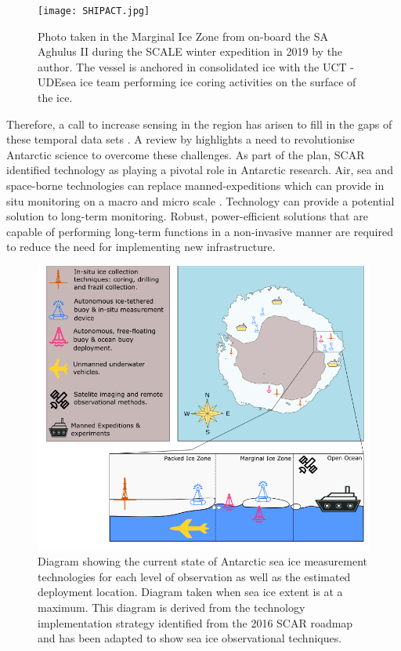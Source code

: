 \begin{figure}[H]
    \centering
    \texttt{[image: SHIPACT.jpg]}
    \caption{Photo taken in the Marginal Ice Zone from on-board the SA Aghulus II during the SCALE winter expedition in 2019 by the author. The vessel is anchored in consolidated ice with the UCT \protect\footnotemark -UDE\protect\footnotemark sea ice team performing ice coring activities on the surface of the ice.}
    \label{fig:cruise}
\end{figure}

Therefore, a call to increase sensing in the region has arisen to fill in the gaps of these temporal data sets \cite{kennicutt2019sustained}. A review by \textcite{kennicutt2016delivering} highlights a need to revolutionise Antarctic science to overcome these challenges. As part of the plan, SCAR identified technology as playing a pivotal role in Antarctic research. Air, sea and space-borne technologies can replace manned-expeditions which can provide in situ monitoring on a macro and micro scale \cite{kennicutt2016delivering}. Technology can provide a potential solution to long-term monitoring. Robust, power-efficient solutions that are capable of performing long-term functions in a non-invasive manner are required to reduce the need for implementing new infrastructure.\par

\begin{figure}[H]
    \centering
    \includegraphics[scale=0.5]{tech.png}
    \caption{ Diagram showing the current state of Antarctic sea ice measurement technologies for each level of observation as well as the estimated deployment location. Diagram taken when sea ice extent is at a maximum. This diagram is derived from the technology implementation strategy identified from the 2016 SCAR roadmap \cite{kennicutt2019sustained}\protect\footnotemark \space and has been adapted to show sea ice observational techniques. }
    \label{fig:chapter1_tech_diag}
\end{figure}

